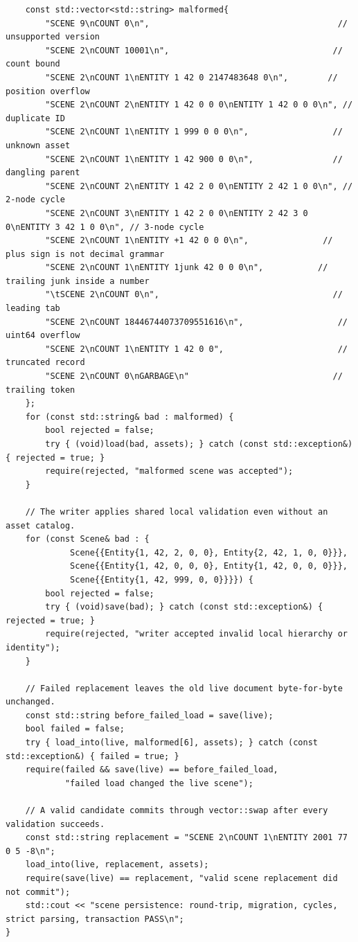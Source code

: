 \begin{verbatim}
    const std::vector<std::string> malformed{
        "SCENE 9\nCOUNT 0\n",                                      // unsupported version
        "SCENE 2\nCOUNT 10001\n",                                 // count bound
        "SCENE 2\nCOUNT 1\nENTITY 1 42 0 2147483648 0\n",        // position overflow
        "SCENE 2\nCOUNT 2\nENTITY 1 42 0 0 0\nENTITY 1 42 0 0 0\n", // duplicate ID
        "SCENE 2\nCOUNT 1\nENTITY 1 999 0 0 0\n",                 // unknown asset
        "SCENE 2\nCOUNT 1\nENTITY 1 42 900 0 0\n",                // dangling parent
        "SCENE 2\nCOUNT 2\nENTITY 1 42 2 0 0\nENTITY 2 42 1 0 0\n", // 2-node cycle
        "SCENE 2\nCOUNT 3\nENTITY 1 42 2 0 0\nENTITY 2 42 3 0 0\nENTITY 3 42 1 0 0\n", // 3-node cycle
        "SCENE 2\nCOUNT 1\nENTITY +1 42 0 0 0\n",               // plus sign is not decimal grammar
        "SCENE 2\nCOUNT 1\nENTITY 1junk 42 0 0 0\n",           // trailing junk inside a number
        "\tSCENE 2\nCOUNT 0\n",                                   // leading tab
        "SCENE 2\nCOUNT 18446744073709551616\n",                   // uint64 overflow
        "SCENE 2\nCOUNT 1\nENTITY 1 42 0 0",                       // truncated record
        "SCENE 2\nCOUNT 0\nGARBAGE\n"                             // trailing token
    };
    for (const std::string& bad : malformed) {
        bool rejected = false;
        try { (void)load(bad, assets); } catch (const std::exception&) { rejected = true; }
        require(rejected, "malformed scene was accepted");
    }

    // The writer applies shared local validation even without an asset catalog.
    for (const Scene& bad : {
             Scene{{Entity{1, 42, 2, 0, 0}, Entity{2, 42, 1, 0, 0}}},
             Scene{{Entity{1, 42, 0, 0, 0}, Entity{1, 42, 0, 0, 0}}},
             Scene{{Entity{1, 42, 999, 0, 0}}}}) {
        bool rejected = false;
        try { (void)save(bad); } catch (const std::exception&) { rejected = true; }
        require(rejected, "writer accepted invalid local hierarchy or identity");
    }

    // Failed replacement leaves the old live document byte-for-byte unchanged.
    const std::string before_failed_load = save(live);
    bool failed = false;
    try { load_into(live, malformed[6], assets); } catch (const std::exception&) { failed = true; }
    require(failed && save(live) == before_failed_load,
            "failed load changed the live scene");

    // A valid candidate commits through vector::swap after every validation succeeds.
    const std::string replacement = "SCENE 2\nCOUNT 1\nENTITY 2001 77 0 5 -8\n";
    load_into(live, replacement, assets);
    require(save(live) == replacement, "valid scene replacement did not commit");
    std::cout << "scene persistence: round-trip, migration, cycles, strict parsing, transaction PASS\n";
}
\end{verbatim}

